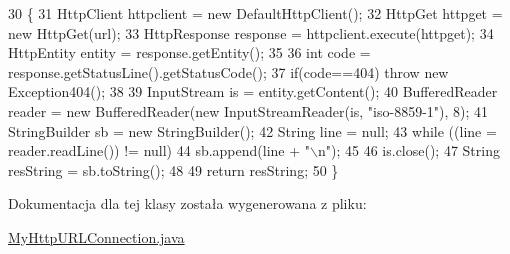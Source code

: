 \begin{DoxyCode}
30                                                                                                   \{
31         HttpClient httpclient = \textcolor{keyword}{new} DefaultHttpClient(); 
32         HttpGet httpget = \textcolor{keyword}{new} HttpGet(url); 
33         HttpResponse response = httpclient.execute(httpget); 
34         HttpEntity entity = response.getEntity(); 
35         
36         \textcolor{keywordtype}{int} code = response.getStatusLine().getStatusCode();
37         \textcolor{keywordflow}{if}(code==404) \textcolor{keywordflow}{throw} \textcolor{keyword}{new} Exception404(); 
38     
39         InputStream is = entity.getContent(); 
40         BufferedReader reader = \textcolor{keyword}{new} BufferedReader(\textcolor{keyword}{new} InputStreamReader(is, \textcolor{stringliteral}{"iso-8859-1"}), 8);
41         StringBuilder sb = \textcolor{keyword}{new} StringBuilder();
42         String line = null;
43         \textcolor{keywordflow}{while} ((line = reader.readLine()) != null) 
44             sb.append(line + \textcolor{stringliteral}{"\(\backslash\)n"});
45         
46         is.close(); 
47         String resString = sb.toString(); 
48         
49         \textcolor{keywordflow}{return} resString;   
50     \}
\end{DoxyCode}


Dokumentacja dla tej klasy została wygenerowana z pliku\+:\begin{DoxyCompactItemize}
\item 
\hyperlink{_my_http_u_r_l_connection_8java}{My\+Http\+U\+R\+L\+Connection.\+java}\end{DoxyCompactItemize}
